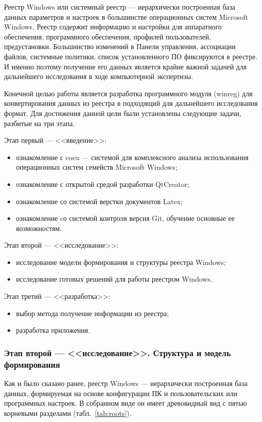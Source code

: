 Реестр Windows или системный реестр --- иерархически построенная база данных параметров и настроек в большинстве операционных систем Microsoft Windows. Реестр содержит информацию и настройки для аппаратного обеспечения, программного обеспечения, профилей пользователей, предустановки. Большинство изменений в Панели управления, ассоциации файлов, системные политики, список установленного ПО фиксируются в реестре. И именно поэтому получение его данных является крайне важной задачей для дальнейшего исследования в ходе компьютерной экспертизы. 


Конечной целью работы является разработка программного модуля (winreg) для конвертирования данных из реестра в подходящий для дальнейшего исследования формат. Для достижения данной цели были установлены следующие задачи, разбитые на три этапа.


Этап первый --- <<введение>>:
\begin{itemize}
  \item ознакомление с coex --- системой для комплексного анализа использования операционных систем семейств Microsoft Windows;
  \item ознакомление с открытой средой разработки QtCreator;
  \item ознакомление со системой верстки документов Latex;
  \item ознакомление cо системой контроля версия Git, обучение основные ее возможностям.
\end{itemize}

Этап второй --- <<исследование>>:
\begin{itemize}
  \item исследование модели формирования и структуры реестра Windows;
  \item исследование готовых решений для работы реестром Windows.
\end{itemize}

Этап третий --- <<разработка>>:
\begin{itemize}
  \item выбор метода получение информации из реестра;
  \item разработка приложения.
\end{itemize}

\subsubsection{Этап второй --- <<исследование>>. Структура и модель формирования}
Как и было сказано ранее, реестр Windows --- иерархически построенная база данных, формируемая на основе конфигурации ПК и пользовательских или программных настроек. В собранном виде он имеет древовидный вид с пятью корневыми разделами (табл.~\ref{tab:roots}).

